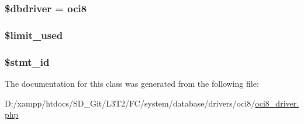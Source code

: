 \subsubsection[{\$dbdriver}]{\setlength{\rightskip}{0pt plus 5cm}\$dbdriver = \textquotesingle{}oci8\textquotesingle{}}\label{class_c_i___d_b__oci8__driver_a0cde2a16322a023d040aa7f725877597}
\hypertarget{class_c_i___d_b__oci8__driver_a96df35d7e3e76bef21ebb80234fe59e8}{}
\subsubsection[{\$limit\+\_\+used}]{\setlength{\rightskip}{0pt plus 5cm}\$limit\+\_\+used}\label{class_c_i___d_b__oci8__driver_a96df35d7e3e76bef21ebb80234fe59e8}
\hypertarget{class_c_i___d_b__oci8__driver_a1a97f17fd259cd27c73b65e6c3706ec0}{}
\subsubsection[{\$stmt\+\_\+id}]{\setlength{\rightskip}{0pt plus 5cm}\$stmt\+\_\+id}\label{class_c_i___d_b__oci8__driver_a1a97f17fd259cd27c73b65e6c3706ec0}


The documentation for this class was generated from the following file\+:\begin{DoxyCompactItemize}
\item 
D\+:/xampp/htdocs/\+S\+D\+\_\+\+Git/\+L3\+T2/\+F\+C/system/database/drivers/oci8/\hyperlink{oci8__driver_8php}{oci8\+\_\+driver.\+php}\end{DoxyCompactItemize}
